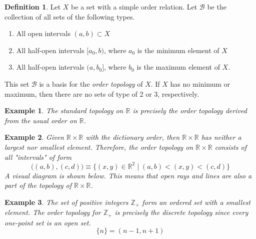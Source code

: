 \documentclass{article}
\newtheorem{example}{Example}[section]
\theoremstyle{remark}
\theoremstyle{definition}
\newtheorem{definition}{Definition}[section]
\begin{document}
\begin{definition}
Let $X$ be a set with a simple order relation. Let $\mathscr{B}$ be the collection of all sets of the following types. 
\begin{enumerate}
    \item All open intervals $(a, b) \subset X$
    \item All half-open intervals $[a_0, b)$, where $a_0$ is the minimum element of $X$
    \item All half-open intervals $(a, b_0]$, where $b_0$ is the maximum element of $X$. 
\end{enumerate}
This set $\mathscr{B}$ is a basis for the \textit{order topology} of $X$. If $X$ has no minimum or maximum, then there are no sets of type of 2 or 3, respectively. 
\end{definition}

\begin{example}
The standard topology on $\mathbb{R}$ is precisely the order topology derived from the usual order on $\mathbb{R}$. 
\end{example}

\begin{example}
Given $\mathbb{R} \times \mathbb{R}$ with the dictionary order, then $\mathbb{R} \times \mathbb{R}$ has neither a largest nor smallest element. Therefore, the order topology on $\mathbb{R} \times \mathbb{R}$ consists of all "intervals" of form
\[\big((a, b), (c, d) \big) \equiv  \{(x, y) \in \mathbb{R}^2 \; | \; (a, b) < (x, y) < (c, d)\}\]
A visual diagram is shown below. This means that open rays and lines are also a part of the topology of $\mathbb{R} \times \mathbb{R}$. 

\begin{center}
\end{center}
\end{example}

\begin{example}
The set of positive integers $\mathbb{Z}_+$ form an ordered set with a smallest element. The order topology for $\mathbb{Z}_+$ is precisely the discrete topology since every one-point set is an open set. 
\[\{n\} = (n-1, n+1)\]
\end{example}
\end{document}

